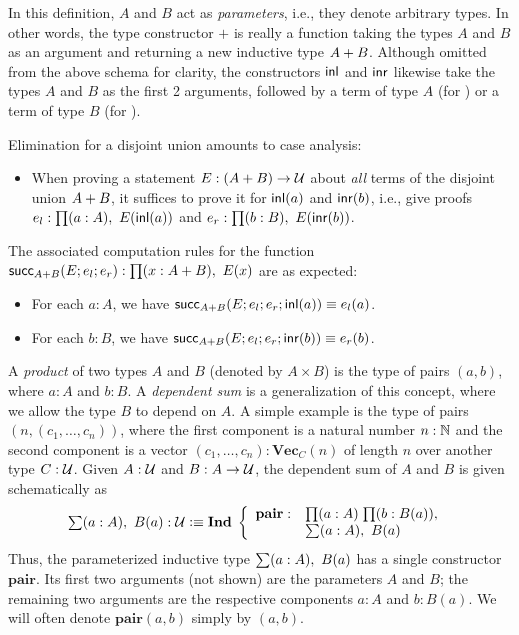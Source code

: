 In this definition, $A$ and $B$ act as \emph{parameters}, i.e., they denote arbitrary types. In other words, the type constructor $+$ is really a function taking the types $A$ and $B$ as an argument and returning a new inductive type $A + B$. Although omitted from the above schema for clarity, the constructors $\mathsf{inl}$ and $\mathsf{inr}$ likewise take the types $A$ and $B$ as the first 2 arguments, followed by a term of type $A$ (for \inl) or a term of type $B$ (for \inr).

Elimination for a disjoint union amounts to case analysis:
\begin{itemize}
\item When proving a statement $E : (A + B) \to \mathcal{U}$ about \emph{all} terms of the disjoint union $A + B$, it suffices to prove it for $\mathsf{inl}(a)$ and $\mathsf{inr}(b)$, i.e., give proofs $e_l : \prd{a:A} E(\inl(a))$ and $e_r : \prd{b:B} E(\inr(b))$.
\end{itemize}
The associated computation rules for the function $\rec_{\disj{A}{B}}(E;e_l;e_r) : \prd{x:\disj{A}{B}} E(x)$ are as expected:
\begin{itemize}
\item For each $a : A$, we have $\mathsf{succ}_{A + B}(E;e_l;e_r;\mathsf{inl}(a)) \equiv e_l(a)$.
\item For each $b : B$, we have $\mathsf{succ}_{A + B}(E;e_l;e_r;\mathsf{inr}(b)) \equiv e_r(b)$.
\end{itemize}

A \emph{product} of two types $A$ and $B$ (denoted by $A \times B$) is the type of pairs $(a,b)$, where $a : A$ and $b : B$. A \emph{dependent sum} is a generalization of this concept, where we allow the type $B$ to depend on $A$. A simple example is the type of pairs $(n,(c_1,\ldots,c_n))$, where the first component is a natural number $n : \mathbb{N}$ and the second component is a vector $(c_1,\ldots,c_n) : \mathbf{Vec}_C(n)$ of length $n$ over another type $C : \mathcal{U}$.
Given $A : \mathcal{U}$ and $B : A \to \mathcal{U}$, the dependent sum of $A$ and $B$ is given schematically as
\[ \sm{a:A} B(a) : \type \defeq \ind \left\{
\begin{array}{ll}
\mathbf{pair} : & \prd{a:A}{b:B(a)} \\
& \sm{a:A} B(a)
\end{array}
\right. \]
Thus, the parameterized inductive type $\sm{a:A} B(a)$ has a single constructor $\mathbf{pair}$. Its first two arguments (not shown) are the parameters $A$ and $B$; the remaining two arguments are the respective components $a : A$ and $b : B(a)$. We will often denote $\mathbf{pair}(a,b)$ simply by $(a,b)$.

